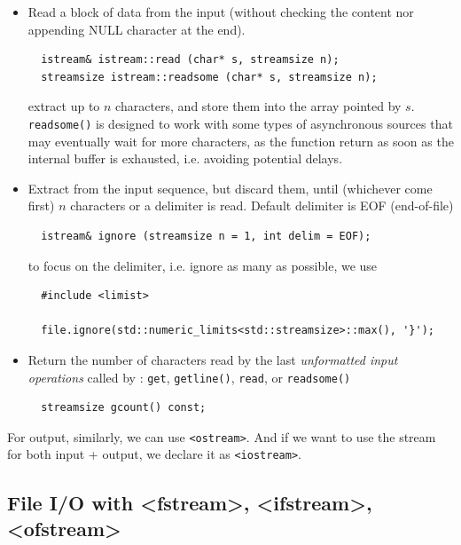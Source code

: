 \begin{itemize}
  \item Read a block of data from the input (without checking the content nor
  appending NULL character at the end).
  \begin{verbatim}
  istream& istream::read (char* s, streamsize n);
  streamsize istream::readsome (char* s, streamsize n);
  \end{verbatim}
  extract up to $n$ characters, and store them into the array pointed by $s$.
  \verb!readsome()! is designed to work with some types of asynchronous sources
  that may eventually wait for more characters, as the function return as soon
  as the internal buffer is exhausted, i.e. avoiding potential delays.
  
  \item Extract from the input sequence, but discard them, until (whichever
  come first) $n$ characters or a delimiter is read. Default delimiter is EOF
  (end-of-file)
  \begin{verbatim}
  istream& ignore (streamsize n = 1, int delim = EOF);
  \end{verbatim}
  to focus on the delimiter, i.e. ignore as many as possible, we use 
  \begin{lstlisting}
  #include <limist>
  
  file.ignore(std::numeric_limits<std::streamsize>::max(), '}');
  \end{lstlisting}
  
  
  \item Return the number of characters read by the last {\it unformatted input
  operations} called by : \verb!get!, \verb!getline()!, \verb!read!, or
  \verb!readsome()!
  \begin{verbatim}
  streamsize gcount() const;
  \end{verbatim}
\end{itemize}

For output, similarly, we can use \verb!<ostream>!. And if we want to use the
stream for both input + output, we declare it as \verb!<iostream>!.

\subsection{File I/O with <fstream>, <ifstream>, <ofstream>}
\label{sec:std::fstream}

